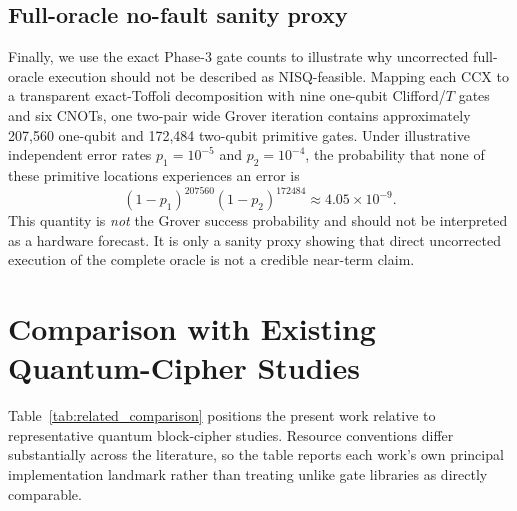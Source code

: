 \documentclass[10pt,a4paper]{article}
\begin{document}
\subsection{Full-oracle no-fault sanity proxy}
Finally, we use the exact Phase-3 gate counts to illustrate why uncorrected full-oracle execution should not be described as NISQ-feasible. Mapping each CCX to a transparent exact-Toffoli decomposition with nine one-qubit Clifford/$T$ gates and six CNOTs, one two-pair wide Grover iteration contains approximately 207,560 one-qubit and 172,484 two-qubit primitive gates. Under illustrative independent error rates $p_1=10^{-5}$ and $p_2=10^{-4}$, the probability that none of these primitive locations experiences an error is
\begin{equation}
    (1-p_1)^{207560}(1-p_2)^{172484}\approx4.05\times10^{-9}.
\end{equation}
This quantity is \emph{not} the Grover success probability and should not be interpreted as a hardware forecast. It is only a sanity proxy showing that direct uncorrected execution of the complete oracle is not a credible near-term claim.

\section{Comparison with Existing Quantum-Cipher Studies}

Table~\ref{tab:related_comparison} positions the present work relative to representative quantum block-cipher studies. Resource conventions differ substantially across the literature, so the table reports each work's own principal implementation landmark rather than treating unlike gate libraries as directly comparable.
\end{document}
